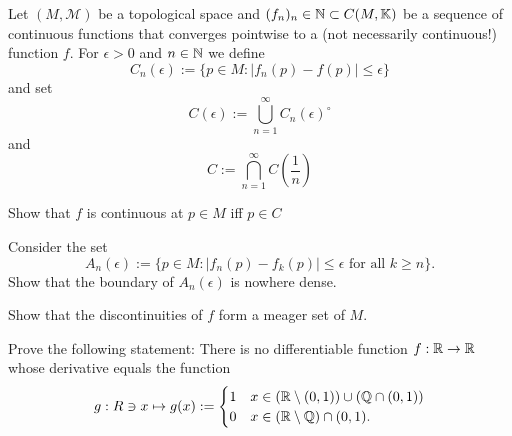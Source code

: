 \begin{Problem}
	Let $(M,\mathcal{M})$ be a topological space and $(f_n)_n\in \mathbb{N}\subset C(M, \mathbb K)$ be a sequence of continuous functions that converges pointwise to a (not necessarily continuous!) function $f$. For $\epsilon > 0$ and $n \in \mathbb{N}$ we
	define
	\[C_n(\epsilon):=\{p\in M: |f_n(p)-f(p)|\le \epsilon\}\]
	and set
	\[C(\epsilon):=\bigcup_{n=1}^\infty C_n(\epsilon)^{\circ}\]
	and
	\[C:=\bigcap_{n=1}^\infty C\left(\frac 1n\right)\]
	\begin{parts}
		\item Show that $f$ is continuous at $p\in M$ iff $p\in C$
		\item Consider the set
		\[A_n(\epsilon):=\{p\in M:|f_n(p)-f_k(p)|\le \epsilon\text{ for all }k\ge n\}.\]
		Show that the boundary of $A_n(\epsilon)$ is nowhere dense.
		\item Show that the discontinuities of $f$ form a meager set of $M$.
		\item Prove the following statement: There is no differentiable function $f:\mathbb{R} \to \mathbb{R}$ whose derivative equals the function
		\[g:R\ni x\mapsto g(x):=\begin{cases}
			1 & x\in (\mathbb{R} \setminus (0,1))\cup (\mathbb{Q} \cap (0,1))\\
			0 & x\in (\mathbb{R} \setminus \mathbb{Q})\cap (0,1).
		\end{cases}\]
	\end{parts}
\end{Problem}
